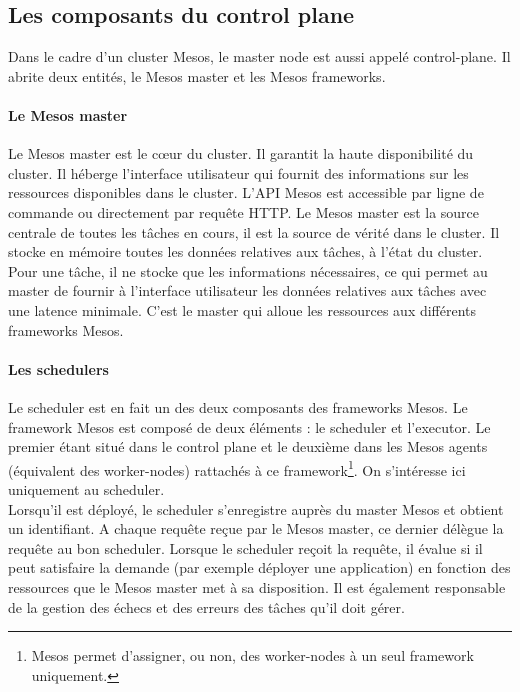 \documentclass[11pt,fleqn]{book} %
\begin{document}
\subsection*{Les composants du control plane}
Dans le cadre d'un cluster Mesos, le master node est aussi appelé control-plane. Il abrite deux entités, le Mesos master et les Mesos frameworks.
\paragraph*{Le Mesos master}
Le Mesos master est le cœur du cluster. Il garantit la haute disponibilité du cluster. Il héberge l'interface utilisateur qui fournit des informations sur les ressources disponibles dans le cluster. L'API Mesos est accessible par ligne de commande ou directement par requête HTTP. Le Mesos master est la source centrale de toutes les tâches en cours, il est la source de vérité dans le cluster. Il stocke en mémoire toutes les données relatives aux tâches, à l'état du cluster. Pour une tâche, il ne stocke que les informations nécessaires, ce qui permet au master de fournir à l'interface utilisateur les données relatives aux tâches avec une latence minimale. C'est le master qui alloue les ressources aux différents frameworks Mesos.

\paragraph*{Les schedulers}
Le scheduler est en fait un des deux composants des frameworks Mesos. Le framework Mesos est composé de deux éléments : le scheduler et l'executor. Le premier étant situé dans le control plane et le deuxième dans les Mesos agents (équivalent des worker-nodes) rattachés à ce framework\footnote{Mesos permet d'assigner, ou non, des worker-nodes à un seul framework uniquement.}. On s'intéresse ici uniquement au scheduler. \\

Lorsqu'il est déployé, le scheduler s'enregistre auprès du master Mesos et obtient un identifiant. A chaque requête reçue par le Mesos master, ce dernier délègue la requête au bon scheduler. Lorsque le scheduler reçoit la requête, il évalue si il peut satisfaire la demande (par exemple déployer une application) en fonction des ressources que le Mesos master met à sa disposition. Il est également responsable de la gestion des échecs et des erreurs des tâches qu'il doit gérer. \\
\end{document}
